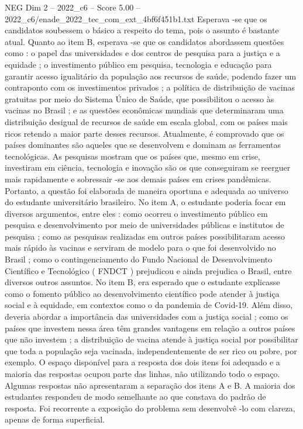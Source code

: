 \begin{textsample}{NEG Dim 2 – 2022\_c6 – Score 5.00 – 2022\_c6/enade\_2022\_tec\_com\_ext\_4bf6f451b1.txt}
Esperava -se que os candidatos soubessem o básico a respeito do tema, pois o assunto é bastante atual.
Quanto ao item B, esperava -se que os candidatos abordassem questões como : o papel das universidades e dos centros de pesquisa para a justiça e a equidade ; o investimento público em pesquisa, tecnologia e educação para garantir acesso igualitário da população aos recursos de saúde, podendo fazer um contraponto com os investimentos privados ; a política de distribuição de vacinas gratuitas por meio do Sistema Único de Saúde, que possibilitou o acesso às vacinas no Brasil ; e as questões econômicas mundiais que determinaram uma distribuição desigual de recursos de saúde em escala global, com os países mais ricos retendo a maior parte desses recursos.
Atualmente, é comprovado que os países dominantes são aqueles que se desenvolvem e dominam as ferramentas tecnológicas.
As pesquisas mostram que os países que, mesmo em crise, investiram em ciência, tecnologia e inovação são os que conseguiram se reerguer mais rapidamente e sobressair -se aos demais países em crises pandêmicas.
Portanto, a questão foi elaborada de maneira oportuna e adequada ao universo do estudante universitário brasileiro.
No item A, o estudante poderia focar em diversos argumentos, entre eles : como ocorreu o investimento público em pesquisa e desenvolvimento por meio de universidades públicas e institutos de pesquisa ; como as pesquisas realizadas em outros países possibilitaram acesso mais rápido às vacinas e serviram de modelo para o que foi desenvolvido no Brasil ; como o contingenciamento do Fundo Nacional de Desenvolvimento Científico e Tecnológico ( FNDCT ) prejudicou e ainda prejudica o Brasil, entre diversos outros assuntos.
No item B, era esperado que o estudante explicasse como o fomento público ao desenvolvimento científico pode atender à justiça social e à equidade, em contextos como o da pandemia de Covid-19.
Além disso, deveria abordar a importância das universidades com a justiça social ; como os países que investem nessa área têm grandes vantagens em relação a outros países que não investem ; a distribuição de vacina atende à justiça social por possibilitar que toda a população seja vacinada, independentemente de ser rico ou pobre, por exemplo.
O espaço disponível para a resposta dos dois itens foi adequado e a maioria das respostas ocupou parte das linhas, não utilizando todo o espaço.
Algumas respostas não apresentaram a separação dos itens A e B.
A maioria dos estudantes respondeu de modo semelhante ao que constava do padrão de resposta.
Foi recorrente a exposição do problema sem desenvolvê -lo com clareza, apenas de forma superficial.

\end{textsample}
